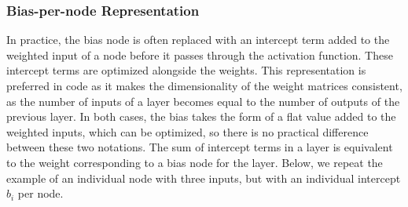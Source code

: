 \documentclass[a4paper,12pt]{article}
\numberwithin{equation}{section}
\begin{document}
\subsubsection{Bias-per-node Representation}
In practice, the bias node is often replaced with an intercept term added to the weighted input of a node before it passes through the activation function. These intercept terms are optimized alongside the weights. This representation is preferred in code as it makes the dimensionality of the weight matrices consistent, as the number of inputs of a layer becomes equal to the number of outputs of the previous layer. In both cases, the bias takes the form of a flat value added to the weighted inputs, which can be optimized, so there is no practical difference between these two notations. The sum of intercept terms in a layer is equivalent to the weight corresponding to a bias node for the layer. Below, we repeat the example of an individual node with three inputs, but with an individual intercept $b_i$ per node.\\
 \\
\end{document}
